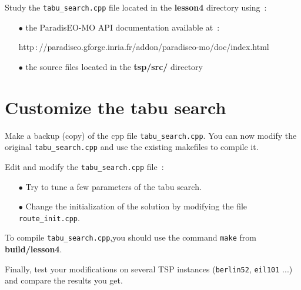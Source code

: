 \documentclass[a4paper]{article}
\begin{document}
     Study the {\tt tabu\_search.cpp} file located in the {\bf lesson4} directory
    using~:
    \begin{itemize}
       \item[$\bullet$] the ParadisEO-MO API documentation available at~:

       \hspace{1cm}http$\,:$//paradiseo.gforge.inria.fr/addon/paradiseo-mo/doc/index.html
       \item[$\bullet$] the source files located in the {\bf tsp/src/} directory
    \end{itemize}

\section{Customize the tabu search}

   Make a backup (copy) of the cpp file {\tt tabu\_search.cpp}. You can now modify the
   original {\tt tabu\_search.cpp} and use the existing makefiles to compile it.

   Edit and modify the {\tt tabu\_search.cpp} file~:
    \begin{itemize}
       \item[$\bullet$] Try to tune a few parameters of the tabu search.
       \item[$\bullet$] Change the initialization of the solution by
       modifying the file {\tt route\_init.cpp}.
    \end{itemize}

    \smallskip
    To compile {\tt tabu\_search.cpp},you should use the
    command {\tt make} from {\bf build/lesson4}.

    \medskip
    Finally, test your modifications on several TSP instances ({\tt berlin52},
    {\tt eil101} ...) and compare the results you get.
\end{document}
